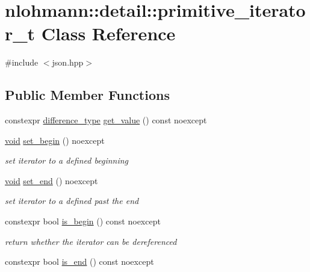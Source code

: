\hypertarget{classnlohmann_1_1detail_1_1primitive__iterator__t}{}\section{nlohmann\+::detail\+::primitive\+\_\+iterator\+\_\+t Class Reference}
\label{classnlohmann_1_1detail_1_1primitive__iterator__t}


{\ttfamily \#include $<$json.\+hpp$>$}

\subsection*{Public Member Functions}
\begin{DoxyCompactItemize}
\item 
constexpr \mbox{\hyperlink{classnlohmann_1_1detail_1_1primitive__iterator__t_af3db0d5c90de427d51645fe73a015553}{difference\+\_\+type}} \mbox{\hyperlink{classnlohmann_1_1detail_1_1primitive__iterator__t_ae952990886ca1756229f916661a8af81}{get\+\_\+value}} () const noexcept
\item 
\mbox{\hyperlink{namespacenlohmann_1_1detail_a59fca69799f6b9e366710cb9043aa77d}{void}} \mbox{\hyperlink{classnlohmann_1_1detail_1_1primitive__iterator__t_a9d9b005906106e12aed738f97d7fee42}{set\+\_\+begin}} () noexcept
\begin{DoxyCompactList}\small\item\em set iterator to a defined beginning \end{DoxyCompactList}\item 
\mbox{\hyperlink{namespacenlohmann_1_1detail_a59fca69799f6b9e366710cb9043aa77d}{void}} \mbox{\hyperlink{classnlohmann_1_1detail_1_1primitive__iterator__t_ad26a823483846a12d890c3feed3097eb}{set\+\_\+end}} () noexcept
\begin{DoxyCompactList}\small\item\em set iterator to a defined past the end \end{DoxyCompactList}\item 
constexpr bool \mbox{\hyperlink{classnlohmann_1_1detail_1_1primitive__iterator__t_a8d1a7d46b3fcd06edd034f04ededb5e4}{is\+\_\+begin}} () const noexcept
\begin{DoxyCompactList}\small\item\em return whether the iterator can be dereferenced \end{DoxyCompactList}\item 
constexpr bool \mbox{\hyperlink{classnlohmann_1_1detail_1_1primitive__iterator__t_a45a7e301c23b5b90417baf2277f40b1d}{is\+\_\+end}} () const noexcept

\end{DoxyCompactItemize}
